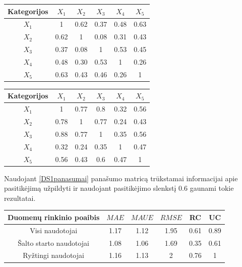 \documentclass{VUMIFInfMagistrinis}
\begin{document}
\begin{center}
	\begin{tabular}{||c c c c c c||} 
		\hline
		Kategorijos & $X_1$ & $X_2$ & $X_3$ & $X_4$ & $X_5$ \\ [0.5ex] 
		\hline\hline
		$X_1$ & 1 & 0.62 & 0.37 & 0.48 & 0.63 \\ 
		\hline
		$X_2$ & 0.62 & 1 & 0.08 & 0.31 & 0.43 \\
		\hline
		$X_3$ & 0.37 & 0.08 & 1 & 0.53 & 0.45 \\
		\hline
		$X_4$ & 0.48 & 0.30 & 0.53 & 1 & 0.26 \\
		\hline
		$X_5$ & 0.63 & 0.43 & 0.46 & 0.26 & 1 \\ [1ex] 
		\hline
	\end{tabular}\label{DS1panasumai}
\end{center}
\begin{center}
	\begin{tabular}{||c c c c c c||} 
		\hline
		Kategorijos & $X_1$ & $X_2$ & $X_3$ & $X_4$ & $X_5$ \\ [0.5ex] 
		\hline\hline
		$X_1$ & 1 & 0.77 & 0.8 & 0.32 & 0.56 \\ 
		\hline
		$X_2$ & 0.78 & 1 & 0.77 & 0.24 & 0.43 \\
		\hline
		$X_3$ & 0.88 & 0.77 & 1 & 0.35 & 0.56 \\
		\hline
		$X_4$ & 0.32 & 0.24 & 0.35 & 1 & 0.47 \\
		\hline
		$X_5$ & 0.56 & 0.43 & 0.6 & 0.47 & 1 \\ [1ex] 
		\hline
	\end{tabular}\label{DS1koreliacijos}
\end{center}
\indent
Naudojant \ref{DS1panasumai} panašumo matricą trūkstamai informacijai apie pasitikėjimą užpildyti ir naudojant pasitikėjimo slenkstį 0.6 gaunami tokie rezultatai.
\begin{center}
	\begin{tabular}{||c c c c c c||} 
		Duomenų rinkinio poaibis & $MAE$ & $MAUE$ & $RMSE$ & RC & UC \\
		\hline
		Visi naudotojai & 1.17 & 1.12 & 1.95 & 0.61 & 0.89 \\
		\hline
		Šalto starto naudotojai & 1.08 & 1.06 & 1.69 & 0.35 & 0.61 \\
		\hline
		Ryžtingi naudotojai & 1.16 & 1.13 & 2 & 0.76 & 1 \\
	\end{tabular}
\end{center}
\end{document}
